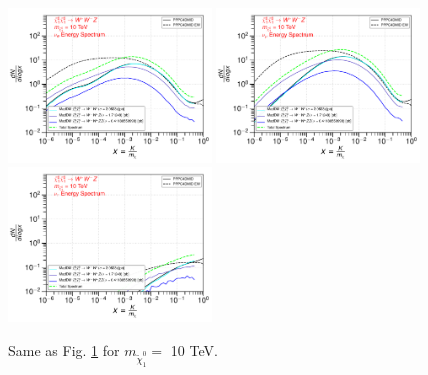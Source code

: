 \documentclass[epj,nopacs,fleqn]{svjour}
\begin{document}
\begin{figure}[!h]
	\subfigure
	{\includegraphics[width=0.48\textwidth]{Fig/Validation_1009/10_neutrinos_e_n1ww_single_10.pdf} }
	\subfigure
	{\includegraphics[width=0.48\textwidth]{Fig/Validation_1009/10_neutrinos_mu_n1ww_single_10.pdf} }
	\subfigure
	{\includegraphics[width=0.48\textwidth]{Fig/Validation_1009/10_neutrinos_tau_n1ww_single_10.pdf} }
	
	\caption{Same as Fig. \ref{singleemission_1tev} for $m_{\tilde \chi_1 ^0}=$ 10 TeV. }
	\label{singleemission_1tev}
\end{figure}
\end{document}
